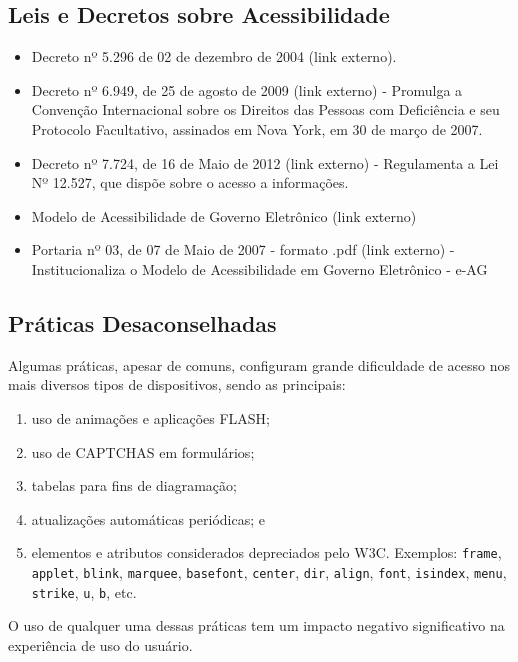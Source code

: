 \documentclass[
  12pt,
  openright,
  twoside,
  a4paper,
  english,
  french,
  spanish,
  brazil
]{abntex2}
\begin{document}
\subsection{Leis e Decretos sobre Acessibilidade}

\begin{itemize}
  \item Decreto nº 5.296 de 02 de dezembro de 2004 (link externo).
  \item
    Decreto nº 6.949, de 25 de agosto de 2009 (link externo) - Promulga a
    Convenção Internacional sobre os Direitos das Pessoas com Deficiência e seu
    Protocolo Facultativo, assinados em Nova York, em 30 de março de 2007.
  \item
    Decreto nº 7.724, de 16 de Maio de 2012 (link externo) - Regulamenta a Lei
    Nº 12.527, que dispõe sobre o acesso a informações.
  \item Modelo de Acessibilidade de Governo Eletrônico (link externo)
  \item
    Portaria nº 03, de 07 de Maio de 2007 - formato .pdf (link externo)
    - Institucionaliza o Modelo de Acessibilidade em Governo Eletrônico - e-AG
\end{itemize}

\subsection{Práticas Desaconselhadas}

Algumas práticas, apesar de comuns, configuram grande dificuldade de acesso nos
mais diversos tipos de dispositivos, sendo as principais:

\begin{enumerate}
  \item uso de animações e aplicações FLASH;
  \item uso de CAPTCHAS em formulários;
  \item tabelas para fins de diagramação;
  \item atualizações automáticas periódicas; e
  \item
    elementos e atributos considerados depreciados pelo W3C. Exemplos:
    \texttt{frame}, \texttt{applet}, \texttt{blink}, \texttt{marquee},
    \texttt{basefont}, \texttt{center}, \texttt{dir}, \texttt{align},
    \texttt{font}, \texttt{isindex}, \texttt{menu}, \texttt{strike}, \texttt{u},
    \texttt{b}, etc.
\end{enumerate}

O uso de qualquer uma dessas práticas tem um impacto negativo significativo na
experiência de uso do usuário.
\end{document}
